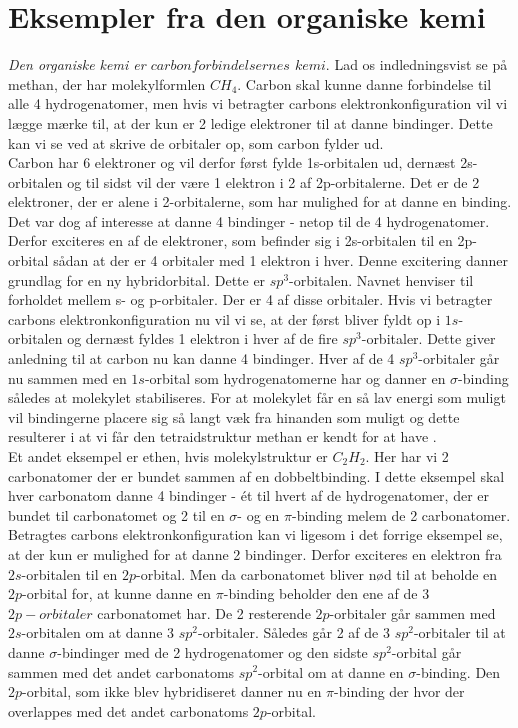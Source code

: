 \section{Eksempler fra den organiske kemi}

\emph{Den organiske kemi er $carbonforbindelsernes$ $kemi$}. Lad os indledningsvist se på methan, der har molekylformlen $CH_4$. Carbon skal kunne danne forbindelse til alle 4 hydrogenatomer, men hvis vi betragter carbons elektronkonfiguration vil vi lægge mærke til, at der kun er 2 ledige elektroner til at danne bindinger. Dette kan vi se ved at skrive de orbitaler op, som carbon fylder ud.
\\
Carbon har 6 elektroner og vil derfor først fylde 1s-orbitalen ud, dernæst 2s-orbitalen og til sidst vil der være 1 elektron i 2 af 2p-orbitalerne. Det er de 2 elektroner, der er alene i 2-orbitalerne, som har mulighed for at danne en binding. Det var dog af interesse at danne 4 bindinger - netop til de 4 hydrogenatomer. Derfor exciteres en af de elektroner, som befinder sig i 2s-orbitalen til en 2p-orbital sådan at der er 4 orbitaler med 1 elektron i hver. Denne excitering danner grundlag for en ny hybridorbital. Dette er $sp^3$-orbitalen. Navnet henviser til forholdet mellem s- og p-orbitaler. Der er 4 af disse orbitaler. Hvis vi betragter carbons elektronkonfiguration nu vil vi se, at der først bliver fyldt op i $1s$-orbitalen og dernæst fyldes 1 elektron i hver af de fire $sp^3$-orbitaler. Dette giver anledning til at carbon nu kan danne 4 bindinger. Hver af de 4 $sp^3$-orbitaler går nu sammen med en $1s$-orbital som hydrogenatomerne har og danner en $\sigma$-binding således at molekylet stabiliseres. For at molekylet får en så lav energi som muligt vil bindingerne placere sig så langt væk fra hinanden som muligt og dette resulterer i at vi får den tetraidstruktur methan er kendt for at have . 
\\

Et andet eksempel er ethen, hvis molekylstruktur er $C_{2}H_2$. Her har vi 2 carbonatomer der er bundet sammen af en dobbeltbinding. I dette eksempel skal hver carbonatom danne 4 bindinger - ét til hvert af de hydrogenatomer, der er bundet til carbonatomet og 2 til en $\sigma$- og en $\pi$-binding melem de 2 carbonatomer. Betragtes carbons elektronkonfiguration kan vi ligesom i det forrige eksempel se, at der kun er mulighed for at danne 2 bindinger. Derfor exciteres en elektron fra $2s$-orbitalen til en $2p$-orbital. Men da carbonatomet bliver nød til at beholde en $2p$-orbital for, at kunne danne en $\pi$-binding beholder den ene af de 3 $2p-orbitaler$ carbonatomet har. De 2 resterende $2p$-orbitaler går sammen med $2s$-orbitalen om at danne 3 $sp^{2}$-orbitaler. Således går 2 af de 3 $sp^2$-orbitaler til at danne $\sigma$-bindinger med de 2 hydrogenatomer og den sidste $sp^2$-orbital går sammen med det andet carbonatoms $sp^2$-orbital om at danne en $\sigma$-binding. Den $2p$-orbital, som ikke blev hybridiseret danner nu en $\pi$-binding der hvor der overlappes med det andet carbonatoms $2p$-orbital. 

